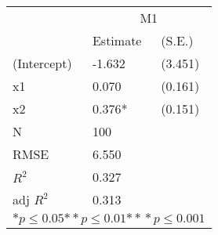 \begin{tabular}{*{3}{l}}
\hline
                  & \multicolumn{2}{c}{M1}   \tabularnewline
                   &Estimate  &(S.E.)  \tabularnewline
 \hline
 \hline
   (Intercept)     &-1.632   &   (3.451) \tabularnewline
   x1              &0.070   &   (0.161) \tabularnewline
   x2              &0.376*   &   (0.151) \tabularnewline
 \hline
 N                 &100       &        \tabularnewline
 RMSE             &6.550         & \tabularnewline
 $R^2$             &0.327         & \tabularnewline
 adj $R^2$         &0.313         & \tabularnewline
 \hline
\hline
 
 \multicolumn{3}{c}{${*  p}\le 0.05$${*\!\!*  p}\le 0.01$${*\!\!*\!\!*  p}\le 0.001$}\tabularnewline
 \end{tabular}